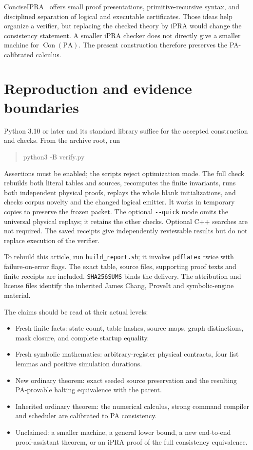 \documentclass[11pt,letterpaper]{article}
\newcommand{\PA}{\mathrm{PA}}
\newcommand{\Con}{\operatorname{Con}}
\newcommand{\file}[1]{\texttt{\nolinkurl{#1}}}
\begin{document}
ConciseIPRA~\cite{ipra} offers small proof presentations, primitive-recursive
syntax, and disciplined separation of logical and executable certificates.
Those ideas help organize a verifier, but replacing the checked theory
by iPRA would change the consistency statement. A smaller iPRA checker
does not directly give a smaller machine for \(\Con(\PA)\). The present
construction therefore preserves the PA-calibrated calculus.

\section{Reproduction and evidence boundaries}

Python 3.10 or later and its standard library suffice for the accepted
construction and checks. From the archive root, run
\begin{quote}\ttfamily
python3 -B verify.py
\end{quote}
Assertions must be enabled; the scripts reject optimization mode.
The full check rebuilds both literal tables and sources, recomputes the
finite invariants, runs both independent physical proofs, replays the whole
blank initializations, and checks corpus novelty and the changed logical
emitter. It works in temporary copies to preserve the frozen packet.
The optional \file{--quick} mode omits the universal physical replays;
it retains the other checks. Optional C++ searches
are not required. The saved receipts give independently reviewable
results but do not replace execution of the verifier.

To rebuild this article, run \file{build_report.sh}; it invokes
\file{pdflatex} twice with failure-on-error flags. The exact table,
source files, supporting proof texts and finite receipts are included.
\file{SHA256SUMS} binds the delivery. The attribution and license files
identify the inherited James Chang, ProveIt and symbolic-engine material.

The claims should be read at their actual levels:
\begin{itemize}
\item Fresh finite facts: state count, table hashes, source maps, graph
      distinctions, mask closure, and complete startup equality.
\item Fresh symbolic mathematics: arbitrary-register physical contracts,
      four list lemmas and positive simulation durations.
\item New ordinary theorem: exact seeded source preservation and the
      resulting PA-provable halting equivalence with the parent.
\item Inherited ordinary theorem: the numerical calculus, strong command
      compiler and scheduler are calibrated to PA consistency.
\item Unclaimed: a smaller machine, a general lower bound, a new
      end-to-end proof-assistant theorem, or an iPRA proof of the full
      consistency equivalence.
\end{itemize}
\end{document}
